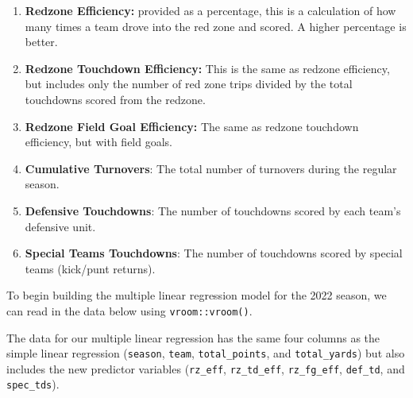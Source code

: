 \documentclass[
  letterpaper,
]{krantz}
\newenvironment{Shaded}{\begin{snugshade}}{\end{snugshade}}
\newcommand{\DecValTok}[1]{\textcolor[rgb]{0.68,0.00,0.00}{#1}}
\newcommand{\FunctionTok}[1]{\textcolor[rgb]{0.28,0.35,0.67}{#1}}
\newcommand{\NormalTok}[1]{\textcolor[rgb]{0.00,0.23,0.31}{#1}}
\newcommand{\OtherTok}[1]{\textcolor[rgb]{0.00,0.23,0.31}{#1}}
\newcommand{\SpecialCharTok}[1]{\textcolor[rgb]{0.37,0.37,0.37}{#1}}
\newcommand{\StringTok}[1]{\textcolor[rgb]{0.13,0.47,0.30}{#1}}
\providecommand{\tightlist}{%
  \setlength{\itemsep}{0pt}\setlength{\parskip}{0pt}}\usepackage{longtable,booktabs,array}
\begin{document}
\begin{enumerate}
\def\labelenumi{\arabic{enumi}.}
\tightlist
\item
  \textbf{Redzone Efficiency:} provided as a percentage, this is a
  calculation of how many times a team drove into the red zone and
  scored. A higher percentage is better.
\item
  \textbf{Redzone Touchdown Efficiency:} This is the same as redzone
  efficiency, but includes only the number of red zone trips divided by
  the total touchdowns scored from the redzone.
\item
  \textbf{Redzone Field Goal Efficiency:} The same as redzone touchdown
  efficiency, but with field goals.
\item
  \textbf{Cumulative Turnovers}: The total number of turnovers during
  the regular season.
\item
  \textbf{Defensive Touchdowns}: The number of touchdowns scored by each
  team's defensive unit.
\item
  \textbf{Special Teams Touchdowns}: The number of touchdowns scored by
  special teams (kick/punt returns).
\end{enumerate}

To begin building the multiple linear regression model for the 2022
season, we can read in the data below using \texttt{vroom::vroom()}.

\begin{Shaded}
\end{Shaded}

The data for our multiple linear regression has the same four columns as
the simple linear regression (\texttt{season}, \texttt{team},
\texttt{total\_points}, and \texttt{total\_yards}) but also includes the
new predictor variables (\texttt{rz\_eff}, \texttt{rz\_td\_eff},
\texttt{rz\_fg\_eff}, \texttt{def\_td}, and \texttt{spec\_tds}).
\end{document}
